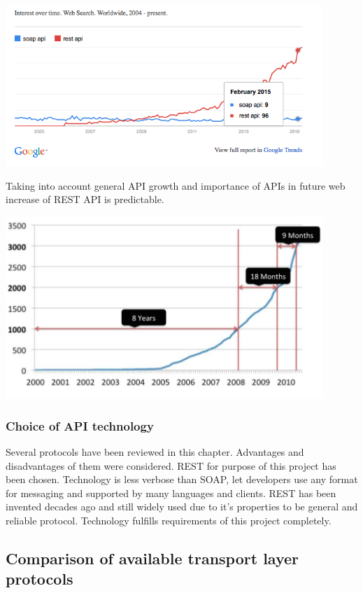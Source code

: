 \documentclass[thesis=M,english]{FITthesis}[2012/10/20]
\begin{document}
\includegraphics[width=0.9\textwidth]{images/google_trends}

Taking into account general API growth and importance of APIs in future web increase of REST API is predictable.

\includegraphics[width=0.9\textwidth]{images/total_apis_growth}

\subsubsection{Choice of API technology}

Several protocols have been reviewed in this chapter. Advantages and disadvantages of them were considered. 
REST for purpose of this project has been chosen. Technology is less verbose than SOAP, let developers use any format for messaging and supported by many languages and clients. REST has been invented decades ago and still widely used due to it's properties to be general and reliable protocol. Technology fulfills requirements of this project completely.

\subsection{Comparison of available transport layer protocols}
\end{document}
